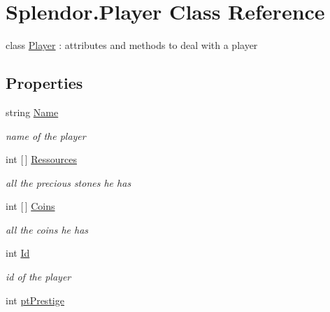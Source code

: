 \hypertarget{class_splendor_1_1_player}{}\section{Splendor.\+Player Class Reference}
\label{class_splendor_1_1_player}


class \hyperlink{class_splendor_1_1_player}{Player} \+: attributes and methods to deal with a player  


\subsection*{Properties}
\begin{DoxyCompactItemize}
\item 
string \hyperlink{class_splendor_1_1_player_a15abd489e523e11b6beb4b186783e47f}{Name}
\begin{DoxyCompactList}\small\item\em name of the player \end{DoxyCompactList}\item 
int \mbox{[}$\,$\mbox{]} \hyperlink{class_splendor_1_1_player_a1c5ccd2470e3bbc84e9a156bc323bfd0}{Ressources}
\begin{DoxyCompactList}\small\item\em all the precious stones he has \end{DoxyCompactList}\item 
int \mbox{[}$\,$\mbox{]} \hyperlink{class_splendor_1_1_player_a729fa09f28e378e7934f3ae54ea463e9}{Coins}
\begin{DoxyCompactList}\small\item\em all the coins he has \end{DoxyCompactList}\item 
int \hyperlink{class_splendor_1_1_player_a5616e3562be3e8800f9e959e7cf75194}{Id}
\begin{DoxyCompactList}\small\item\em id of the player \end{DoxyCompactList}\item 
int \hyperlink{class_splendor_1_1_player_ab158cd0ee0def52608afd93eb97ba094}{pt\+Prestige}
\end{DoxyCompactItemize}


